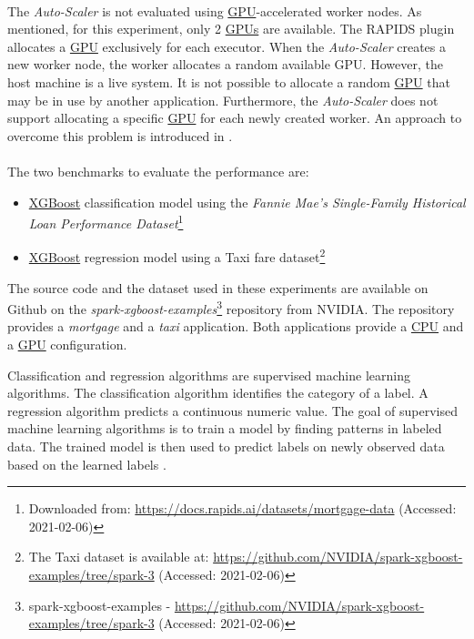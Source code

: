 \paragraph{}
The \textit{Auto-Scaler} is not evaluated using \hyperlink{abbr:gpu}{GPU}-accelerated worker nodes. As mentioned, for this experiment, only 2 \hyperlink{abbr:gpu}{GPUs} are available. The RAPIDS plugin allocates a \hyperlink{abbr:gpu}{GPU} exclusively for each executor. When the \textit{Auto-Scaler} creates a new worker node, the worker allocates a random available GPU.
However, the host machine is a live system. It is not possible to allocate a random \hyperlink{abbr:gpu}{GPU} that may be in use by another application. Furthermore, the \textit{Auto-Scaler} does not support allocating a specific \hyperlink{abbr:gpu}{GPU} for each newly created worker. An approach to overcome this problem is introduced in .

\paragraph{}
The two benchmarks to evaluate the performance are:
\begin{itemize}
\item \hyperlink{abbr:xgboost}{XGBoost} classification model using the \textit{Fannie Mae's Single-Family Historical Loan Performance Dataset}\footnote{Downloaded from: \url{https://docs.rapids.ai/datasets/mortgage-data} (Accessed: 2021-02-06)}\cite{Fannie2021Mortgage}

\item \hyperlink{abbr:xgboost}{XGBoost} regression model using a Taxi fare dataset\footnote{The Taxi dataset is available at: \url{https://github.com/NVIDIA/spark-xgboost-examples/tree/spark-3} (Accessed: 2021-02-06)}
\end{itemize}
The source code and the dataset used in these experiments are available on Github on the \textit{spark-xgboost-examples}\footnote{spark-xgboost-examples - \url{https://github.com/NVIDIA/spark-xgboost-examples/tree/spark-3} (Accessed: 2021-02-06)} repository from NVIDIA.
The repository provides a \textit{mortgage} and a \textit{taxi} application. Both applications provide a \hyperlink{abbr:cpu}{CPU} and a \hyperlink{abbr:gpu}{GPU} configuration.

Classification and regression algorithms are supervised machine learning algorithms.
The classification algorithm identifies the category of a label.
A regression algorithm predicts a continuous numeric value.
The goal of supervised machine learning algorithms is to train a model by finding patterns in labeled data. The trained model is then used to predict labels on newly observed data based on the learned labels \cite{Mcdonald2020SparkRapids}.


